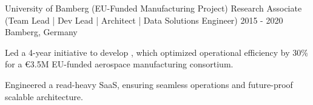 \begin{cventries}
    
\vspace{4ex}




    
        
  \cventry
    {University of Bamberg (EU-Funded Manufacturing Project)} %
    {Research Associate (Team Lead | Dev Lead | Architect | Data Solutions Engineer)} %
    {2015 - 2020} %
    {Bamberg, Germany} %
    {
      \begin{cvitems} %
		\item {Led a 4-year initiative to develop , which optimized operational efficiency by 30\% for a €3.5M EU-funded aerospace manufacturing consortium.}
		\item {Engineered a read-heavy SaaS, ensuring seamless operations and future-proof scalable architecture.}
      \end{cvitems}
    }
    
    
\vspace{4ex}







\end{cventries}

